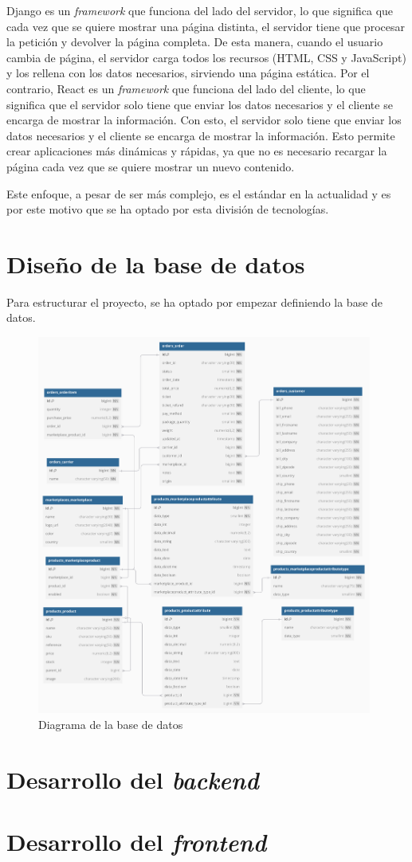 Django es un \textit{framework} que funciona del lado del servidor, lo que significa que cada vez que se quiere mostrar una página distinta, el servidor tiene que procesar la petición y devolver la página completa. De esta manera, cuando el usuario cambia de página, el servidor carga todos los recursos (HTML, CSS y JavaScript) y los rellena con los datos necesarios, sirviendo una página estática. Por el contrario, React es un \textit{framework} que funciona del lado del cliente, lo que significa que el servidor solo tiene que enviar los datos necesarios y el cliente se encarga de mostrar la información. Con esto, el servidor solo tiene que enviar los datos necesarios y el cliente se encarga de mostrar la información. Esto permite crear aplicaciones más dinámicas y rápidas, ya que no es necesario recargar la página cada vez que se quiere mostrar un nuevo contenido.

Este enfoque, a pesar de ser más complejo, es el estándar en la actualidad y es por este motivo que se ha optado por esta división de tecnologías.

\section{Diseño de la base de datos}
\label{sec:diseno_base_datos}

Para estructurar el proyecto, se ha optado por empezar definiendo la base de datos.

\begin{figure}
    \centering
    \includegraphics[width=0.98\textwidth]{figures/design_develop/database_diagram.pdf}
    \caption{Diagrama de la base de datos}
    \label{fig:diagrama_base_datos}
\end{figure}

\section{Desarrollo del \textit{backend}}


\section{Desarrollo del \textit{frontend}}